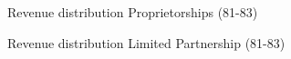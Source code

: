 \documentclass[
  12pt]{article}
\theoremstyle{definition}
\theoremstyle{remark}
\begin{document}
\begin{figure}

\caption{\label{fig-revenue-hist-bunch-0}Revenue distribution
Proprietorships (81-83)}


\end{figure}%

\begin{figure}

\caption{\label{fig-revenue-hist-bunch-1}Revenue distribution Limited
Partnership (81-83)}


\end{figure}%
\end{document}
